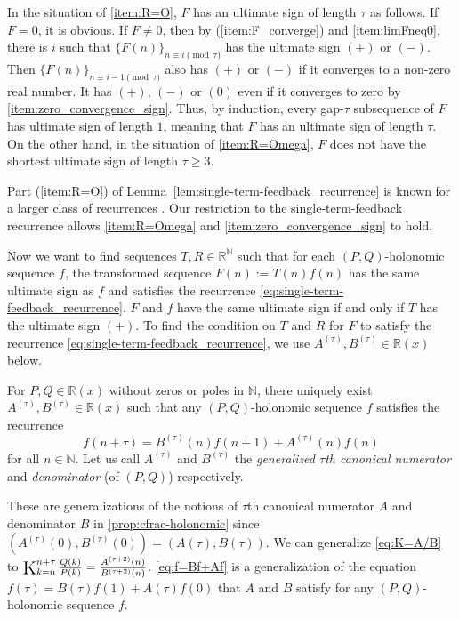 \documentclass[a4paper,UKenglish,cleveref,autoref,thm-restate]{lipics-v2021}
\newcommand{\R}{\mathbb{R}}
\newcommand{\N}{\mathbb{N}}
\newcommand\Kettenbruch{\operatornamewithlimits{\mathchoice
     {\vcenter{\hbox{\huge $\mathrm{K}$}}}
     {\vcenter{\hbox{\Large $\mathrm{K}$}}}
     {\mathrm{K}}
     {\mathrm{K}}}}
\begin{document}
In the situation of \eqref{item:R=O}, $F$ has an ultimate sign of length $\tau$ as follows. 
If $F=0$, it is obvious. If $F \neq 0$, then 
by (\ref{item:F_converge}) and \eqref{item:limFneq0}, 
there is $i$ such that 
$\{ F(n) \}_{n \equiv i \pmod{\tau}}$ has 
the ultimate sign $(+)$ or $(-)$. 
Then $\{ F(n) \}_{n \equiv i-1 \pmod{\tau}}$ also has 
$(+)$ or $(-)$ if it converges to a non-zero real number. 
It has $(+)$, $(-)$ or $(0)$ even if it converges to zero by \eqref{item:zero_convergence_sign}. 
Thus, by induction, 
every gap-$\tau$ subsequence of $F$ has ultimate sign of length $1$, 
meaning that $F$ has an ultimate sign of length $\tau$. 
On the other hand, in the situation of \eqref{item:R=Omega}, $F$ does not have the shortest ultimate sign of length $\tau \geq 3$. 

Part (\ref{item:R=O}) of Lemma~\ref{lem:single-term-feedback_recurrence}
is known
for a larger class of recurrences \cite[Theorem~6]{Koo91}. 
Our restriction to the single-term-feedback recurrence allows \eqref{item:R=Omega} and \eqref{item:zero_convergence_sign} to hold. 

Now we want to find sequences $T, R \in \R ^\N$
such that for each $(P, Q)$-holonomic sequence $f$, 
the transformed sequence $F(n) := T(n)f(n)$
has the same ultimate sign as $f$ and
satisfies the recurrence \eqref{eq:single-term-feedback_recurrence}. $F$ and $f$ have the same ultimate sign if and only if $T$ has the ultimate sign $(+)$. 
To find the condition on $T$ and $R$ for $F$ to satisfy the recurrence \eqref{eq:single-term-feedback_recurrence},
we use $A^{(\tau)}, B^{(\tau)} \in \R(x)$ below. 

\begin{definition} \label{def:generalized_normal_numerator/denominator}
For $P, Q \in \R(x)$ without zeros or poles in $\N$, there uniquely exist $A^{(\tau)}, B^{(\tau)} \in \R(x)$ such that any $(P, Q)$-holonomic sequence $f$ satisfies the recurrence 
\begin{equation}\label{eq:f=Bf+Af}
f(n+\tau) = B^{(\tau)}(n) f(n+1) + A^{(\tau)}(n) f(n)
\end{equation}
for all $n \in \N$. Let us call $A^{(\tau)}$ and $B^{(\tau)}$ the \emph{generalized $\tau$th canonical numerator} and \emph{denominator} (of $(P, Q)$) respectively. 
\end{definition}

These are generalizations of the notions of 
$\tau$th canonical numerator $A$ and denominator $B$ in \cref{prop:cfrac-holonomic} since $(A^{(\tau)}(0), B^{(\tau)}(0)) = (A(\tau), B(\tau))$. We can generalize \cref{eq:K=A/B} to $\Kettenbruch_{k=n}^{n+\tau} \frac{Q(k)}{P(k)} = \frac{A^{(\tau+2)}(n)}{B^{(\tau+2)}(n)}$. 
\cref{eq:f=Bf+Af} is a generalization of the equation
$f(\tau) = B(\tau)f(1) + A(\tau)f(0)$ 
that $A$ and $B$ satisfy 
for any $(P, Q)$-holonomic sequence $f$.
\end{document}
